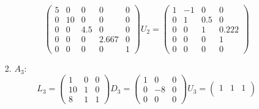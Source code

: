 \documentclass[conference,onecolumn]{IEEEtran}
\begin{document}
\begin{enumerate}[label=\arabic{enumi}.]
\begin{enumerate}
\begin{enumerate}
$$                                  \begin{pmatrix}
                                      5 & 0  & 0   & 0     & 0 \\
                                      0 & 10 & 0   & 0     & 0 \\
                                      0 & 0  & 4.5 & 0     & 0 \\
                                      0 & 0  & 0   & 2.667 & 0 \\
                                      0 & 0  & 0   & 0     & 1
                                  \end{pmatrix}
                                  U_2 =
                                  \begin{pmatrix}
                                      1 & -1 & 0   & 0     \\
                                      0 & 1  & 0.5 & 0     \\
                                      0 & 0  & 1   & 0.222 \\
                                      0 & 0  & 0   & 1     \\
                                      0 & 0  & 0   & 0
                                  \end{pmatrix}
                              $$
                        \item $A_3$:
                              $$
                                  L_3 =
                                  \begin{pmatrix}
                                      1  & 0 & 0 \\
                                      10 & 1 & 0 \\
                                      8  & 1 & 1
                                  \end{pmatrix}
                                  D_3 =
                                  \begin{pmatrix}
                                      1 & 0  & 0 \\
                                      0 & -8 & 0 \\
                                      0 & 0  & 0
                                  \end{pmatrix}
                                  U_3 =
                                  \begin{pmatrix}
                                      1 & 1 & 1     \\

\end{pmatrix}$$
\end{enumerate}
\end{enumerate}
\end{enumerate}
\end{document}
